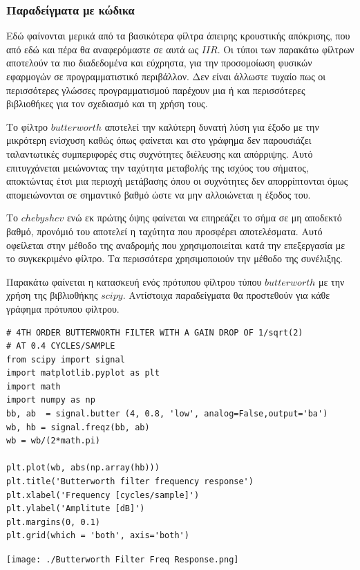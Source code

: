 \documentclass[breaklines=true, 12pt]{article}
\begin{document}
\subsubsection{Παραδείγματα με κώδικα}
\label{sec:orgd012dee}
Εδώ φαίνονται μερικά από τα βασικότερα φίλτρα άπειρης κρουστικής απόκρισης, που
από εδώ και πέρα θα αναφερόμαστε σε αυτά ως \(IIR\). Οι τύποι των παρακάτω φίλτρων
αποτελούν τα πιο διαδεδομένα και εύχρηστα, για την προσομοίωση φυσικών εφαρμογών
σε προγραμματιστικό περιβάλλον. Δεν είναι άλλωστε τυχαίο πως οι περισσότερες
γλώσσες προγραμματισμού παρέχουν μια ή και περισσότερες βιβλιοθήκες για τον
σχεδιασμό και τη χρήση τους.

Το φίλτρο \(butterworth\) αποτελεί την καλύτερη δυνατή λύση για έξοδο με την μικρότερη
ενίσχυση καθώς όπως φαίνεται και στο γράφημα δεν παρουσιάζει ταλαντωτικές
συμπεριφορές στις συχνότητες διέλευσης και απόρριψης. Αυτό επιτυγχάνεται
μειώνοντας την ταχύτητα μεταβολής της ισχύος του σήματος, αποκτώντας έτσι μια
περιοχή μετάβασης όπου οι συχνότητες δεν απορρίπτονται όμως απομειώνονται σε
σημαντικό βαθμό ώστε να μην αλλοιώνεται η έξοδος του.

Το \(chebyshev\) ενώ εκ πρώτης όψης φαίνεται να επηρεάζει το σήμα σε μη
αποδεκτό βαθμό, προνόμιό του αποτελεί η ταχύτητα που προσφέρει αποτελέσματα.
Αυτό οφείλεται στην μέθοδο της αναδρομής που χρησιμοποιείται κατά την επεξεργασία
με το συγκεκριμένο φίλτρο. Τα περισσότερα χρησιμοποιούν την μέθοδο της συνέλιξης.

Παρακάτω φαίνεται η κατασκευή ενός πρότυπου φίλτρου τύπου \(butterworth\) με την χρήση
της βιβλιοθήκης \(scipy\). Αντίστοιχα παραδείγματα θα προστεθούν για κάθε γράφημα
πρότυπου φίλτρου.

\begin{verbatim}
# 4TH ORDER BUTTERWORTH FILTER WITH A GAIN DROP OF 1/sqrt(2)
# AT 0.4 CYCLES/SAMPLE
from scipy import signal
import matplotlib.pyplot as plt
import math
import numpy as np
bb, ab  = signal.butter (4, 0.8, 'low', analog=False,output='ba')
wb, hb = signal.freqz(bb, ab)
wb = wb/(2*math.pi)

plt.plot(wb, abs(np.array(hb)))
plt.title('Butterworth filter frequency response')
plt.xlabel('Frequency [cycles/sample]')
plt.ylabel('Amplitute [dB]')
plt.margins(0, 0.1)
plt.grid(which = 'both', axis='both')
\end{verbatim}

\begin{center}
\texttt{[image: ./Butterworth Filter Freq Response.png]}
\end{center}
\end{document}
